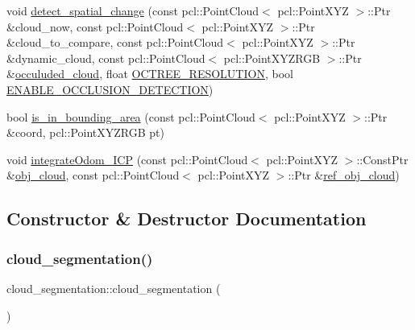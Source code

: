 \begin{DoxyCompactItemize}
\item 
void \hyperlink{classdatmo_1_1cloud__segmentation_a6dcd90f46e590756a42aafd290443fcf}{detect\+\_\+spatial\+\_\+change} (const pcl\+::\+Point\+Cloud$<$ pcl\+::\+Point\+X\+YZ $>$\+::Ptr \&cloud\+\_\+now, const pcl\+::\+Point\+Cloud$<$ pcl\+::\+Point\+X\+YZ $>$\+::Ptr \&cloud\+\_\+to\+\_\+compare, const pcl\+::\+Point\+Cloud$<$ pcl\+::\+Point\+X\+YZ $>$\+::Ptr \&dynamic\+\_\+cloud, const pcl\+::\+Point\+Cloud$<$ pcl\+::\+Point\+X\+Y\+Z\+R\+GB $>$\+::Ptr \&\hyperlink{classdatmo_1_1cloud__segmentation_a2f85f1a51b2e90dbce996d90cb3e0155}{occuluded\+\_\+cloud}, float \hyperlink{classdatmo_1_1cloud__segmentation_aba086f9f8e05f18c02c042c057854a06}{O\+C\+T\+R\+E\+E\+\_\+\+R\+E\+S\+O\+L\+U\+T\+I\+ON}, bool \hyperlink{classdatmo_1_1cloud__segmentation_a5f7ffa75c60af605cc914de7296cddb1}{E\+N\+A\+B\+L\+E\+\_\+\+O\+C\+C\+L\+U\+S\+I\+O\+N\+\_\+\+D\+E\+T\+E\+C\+T\+I\+ON})
\item 
bool \hyperlink{classdatmo_1_1cloud__segmentation_a5bcf85ac924671c64840ac2087877a5f}{is\+\_\+in\+\_\+bounding\+\_\+area} (const pcl\+::\+Point\+Cloud$<$ pcl\+::\+Point\+X\+YZ $>$\+::Ptr \&coord, pcl\+::\+Point\+X\+Y\+Z\+R\+GB pt)
\item 
void \hyperlink{classdatmo_1_1cloud__segmentation_a2386bd377507c5e1029f73285d8e7251}{integrate\+Odom\+\_\+\+I\+CP} (const pcl\+::\+Point\+Cloud$<$ pcl\+::\+Point\+X\+YZ $>$\+::Const\+Ptr \&\hyperlink{classdatmo_1_1cloud__segmentation_ad946a48ab59bf9f48338f9ef0702181c}{obj\+\_\+cloud}, const pcl\+::\+Point\+Cloud$<$ pcl\+::\+Point\+X\+YZ $>$\+::Ptr \&\hyperlink{classdatmo_1_1cloud__segmentation_a4f4926a401828fc5226665963a2212cf}{ref\+\_\+obj\+\_\+cloud})
\end{DoxyCompactItemize}


\subsection{Constructor \& Destructor Documentation}
\mbox{\label{classdatmo_1_1cloud__segmentation_a7624176c1ff33d2fa3930bf9eef89c19}} 
\subsubsection{\texorpdfstring{cloud\+\_\+segmentation()}{cloud\_segmentation()}}
{\footnotesize\ttfamily cloud\+\_\+segmentation\+::cloud\+\_\+segmentation (\begin{DoxyParamCaption}{ }\end{DoxyParamCaption})}


